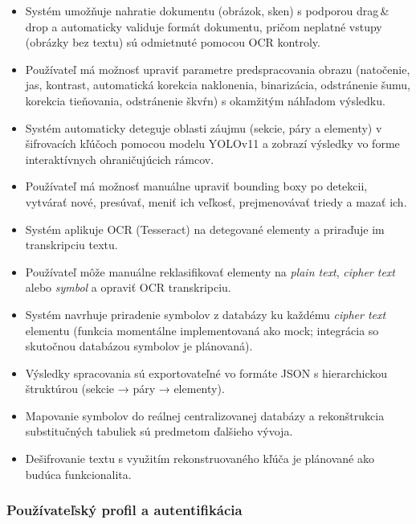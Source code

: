 \begin{itemize}
    \item[\checkmark] Systém umožňuje nahratie dokumentu (obrázok, sken) s podporou drag\,\&\,drop a automaticky validuje formát dokumentu, pričom neplatné vstupy (obrázky bez textu) sú odmietnuté pomocou OCR kontroly.
    \item[\checkmark] Používateľ má možnosť upraviť parametre predspracovania obrazu (natočenie, jas, kontrast, automatická korekcia naklonenia, binarizácia, odstránenie šumu, korekcia tieňovania, odstránenie škvŕn) s okamžitým náhľadom výsledku.
    \item[\checkmark] Systém automaticky deteguje oblasti záujmu (sekcie, páry a elementy) v šifrovacích kľúčoch pomocou modelu YOLOv11 a zobrazí výsledky vo forme interaktívnych ohraničujúcich rámcov.
    \item[\checkmark] Používateľ má možnosť manuálne upraviť bounding boxy po detekcii, vytvárať nové, presúvať, meniť ich veľkosť, prejmenovávať triedy a mazať ich.
    \item[\checkmark] Systém aplikuje OCR (Tesseract) na detegované elementy a priraďuje im transkripciu textu.
    \item[\checkmark] Používateľ môže manuálne reklasifikovať elementy na \textit{plain text}, \textit{cipher text} alebo \textit{symbol} a opraviť OCR transkripciu.
    \item[\checkmark] Systém navrhuje priradenie symbolov z databázy ku každému \textit{cipher text} elementu (funkcia momentálne implementovaná ako mock; integrácia so skutočnou databázou symbolov je plánovaná).
    \item[\checkmark] Výsledky spracovania sú exportovateľné vo formáte JSON s hierarchickou štruktúrou (sekcie → páry → elementy).
    \item[$\circ$] Mapovanie symbolov do reálnej centralizovanej databázy a rekonštrukcia substitučných tabuliek sú predmetom ďalšieho vývoja.
    \item[$\circ$] Dešifrovanie textu s využitím rekonstruovaného kľúča je plánované ako budúca funkcionalita.
\end{itemize}

\subsubsection{Používateľský profil a autentifikácia}

